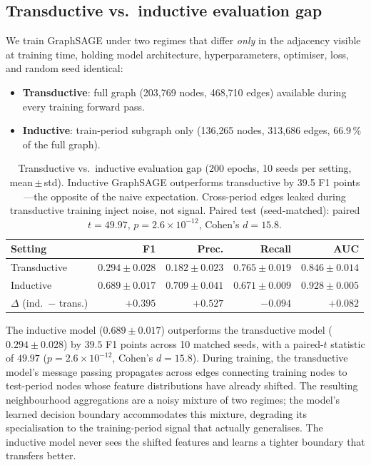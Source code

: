 \FloatBarrier
\subsection{Transductive vs.\ inductive evaluation gap}
\label{sec:leakage_gap}

We train GraphSAGE under two regimes that differ \emph{only} in the
adjacency visible at training time, holding model architecture,
hyperparameters, optimiser, loss, and random seed identical:
\begin{itemize}[leftmargin=*]
  \item \textbf{Transductive}: full graph (203{,}769 nodes,
    468{,}710 edges) available during every training forward pass.
  \item \textbf{Inductive}: train-period subgraph only (136{,}265
    nodes, 313{,}686 edges, 66.9\,\% of the full graph).
\end{itemize}

\begin{table}[htbp]
\centering
\caption{Transductive vs.\ inductive evaluation gap (200 epochs,
  10 seeds per setting, mean\,$\pm$\,std).  Inductive GraphSAGE
  outperforms transductive by 39.5 F1 points---the opposite of the
  naive expectation.  Cross-period edges leaked during transductive
  training inject noise, not signal.  Paired test (seed-matched):
  paired $t = 49.97$, $p = 2.6 \times 10^{-12}$, Cohen's $d = 15.8$.}
\label{tab:leakage_gap}
\small
\begin{tabular}{lrrrr}
\toprule
\textbf{Setting} & \textbf{F1} & \textbf{Prec.}
  & \textbf{Recall} & \textbf{AUC} \\
\midrule
Transductive & $0.294 \pm 0.028$ & $0.182 \pm 0.023$
  & $0.765 \pm 0.019$ & $0.846 \pm 0.014$ \\
Inductive    & $\mathbf{0.689 \pm 0.017}$ & $\mathbf{0.709 \pm 0.041}$
  & $0.671 \pm 0.009$ & $\mathbf{0.928 \pm 0.005}$ \\
\midrule
$\Delta$ (ind.\ $-$ trans.) & $+0.395$ & $+0.527$ & $-0.094$ & $+0.082$ \\
\bottomrule
\end{tabular}
\end{table}

The inductive model ($0.689 \pm 0.017$) outperforms the transductive
model ($0.294 \pm 0.028$) by $39.5$ F1 points across 10 matched seeds,
with a paired-$t$ statistic of $49.97$ ($p = 2.6 \times 10^{-12}$,
Cohen's $d = 15.8$).  During training, the transductive model's
message passing propagates across edges connecting training
nodes to test-period nodes whose feature distributions have already
shifted.  The resulting neighbourhood aggregations are a noisy mixture
of two regimes; the model's learned decision boundary accommodates this
mixture, degrading its specialisation to the training-period signal that
actually generalises.  The inductive model never sees the shifted
features and learns a tighter boundary that transfers better.

